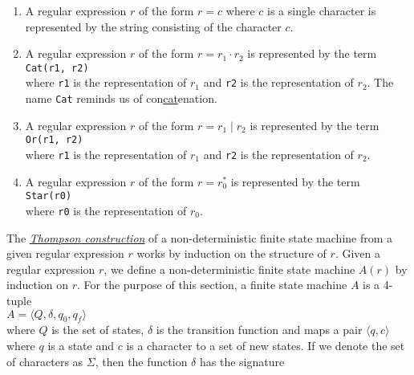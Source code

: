 \begin{enumerate}
\item A regular expression $r$ of the form $r = c$ where $c$ is a single character is
      represented by the string consisting of the character $c$.
\item A regular expression $r$ of the form $r = r_1 \cdot r_2$ is represented by the term
      \\[0.2cm]
      \hspace*{1.3cm}
      \texttt{Cat(r1, r2)}
      \\[0.2cm]
      where \texttt{r1} is the representation of $r_1$ and \texttt{r2} is the
      representation of $r_2$.  The name \texttt{Cat} reminds us of con\underline{cat}enation. 
\item A regular expression $r$ of the form $r = r_1 \mid r_2$ is represented by the term
      \\[0.2cm]
      \hspace*{1.3cm}
      \texttt{Or(r1, r2)}
      \\[0.2cm]
      where \texttt{r1} is the representation of $r_1$ and \texttt{r2} is the
      representation of $r_2$.
\item A regular expression $r$ of the form $r = r_0^*$ is represented by the term
      \\[0.2cm]
      \hspace*{1.3cm}
      \texttt{Star(r0)}
      \\[0.2cm]
      where \texttt{r0} is the representation of $r_0$. 
\end{enumerate}
The \href{https://en.wikipedia.org/wiki/Thompson%27s_construction_algorithm}{\emph{Thompson construction}}
of a non-deterministic finite state machine from a given regular 
expression $r$ works by induction on the structure of $r$.  Given a regular expression
$r$,  we define a non-deterministic finite state machine $A(r)$ by induction on $r$.
For the purpose of this section, a finite state machine $A$ is a 4-tuple
\\[0.2cm]
\hspace*{1.3cm}
$A = \langle Q, \delta, q_0, q_f \rangle$
\\[0.2cm]
where $Q$ is the set of states, 
$\delta$ is the transition function and maps a pair $\langle q, c \rangle$ where $q$ is a
state and $c$ is a character to a set of new states.  If we denote the set of characters
as $\Sigma$, then the function $\delta$ has the signature
\\[0.2cm]
\hspace*{1.3cm}
